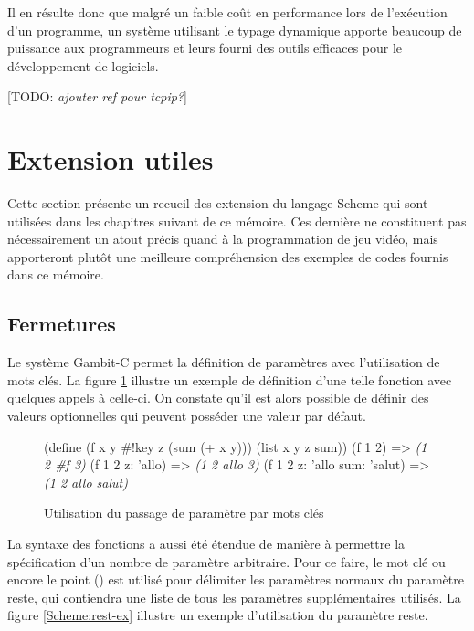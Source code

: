 \documentclass[12pt,oneside,letterpaper,francais]{book}
\newcommand{\todo}[1]{[TODO: {\it #1}]}
\newcommand{\scheme}[1]{\selectlanguage{english}{\tt #1}\selectlanguage{french}}
\newcommand{\schemeresult}[1]{{\it #1}}
\begin{document}
Il en résulte donc que malgré un faible coût en performance lors de
l'exécution d'un programme, un système utilisant le typage dynamique
apporte beaucoup de puissance aux programmeurs et leurs fourni des
outils efficaces pour le développement de logiciels.

\todo{ajouter ref pour tcpip?}



\section{Extension utiles}

Cette section présente un recueil des extension du langage Scheme qui
sont utilisées dans les chapitres suivant de ce mémoire. Ces dernière
ne constituent pas nécessairement un atout précis quand à la
programmation de jeu vidéo, mais apporteront plutôt une meilleure
compréhension des exemples de codes fournis dans ce mémoire.

\subsection{Fermetures}

Le système Gambit-C permet la définition de paramètres avec
l'utilisation de mots clés. La figure \ref{Scheme:fun-key} illustre un
exemple de définition d'une telle fonction avec quelques appels à
celle-ci. On constate qu'il est alors possible de définir des valeurs
optionnelles qui peuvent posséder une valeur par défaut.

\begin{figure}[htb1]
  \begin{schemecode}
(define (f x y \#!key z (sum (+ x y)))
  (list x y z sum))
(f 1 2)                      => \schemeresult{(1 2 \#f 3)}
(f 1 2 z: 'allo)             => \schemeresult{(1 2 allo 3)}
(f 1 2 z: 'allo sum: 'salut) => \schemeresult{(1 2 allo salut)}
  \end{schemecode}
  \caption{Utilisation du passage de paramètre par mots clés}
  \label{Scheme:fun-key}
\end{figure}

La syntaxe des fonctions a aussi été étendue de manière à permettre la
spécification d'un nombre de paramètre arbitraire. Pour ce faire, le
mot clé \scheme{\#!rest} ou encore le point (\scheme{.}) est utilisé
pour délimiter les paramètres normaux du paramètre reste, qui
contiendra une liste de tous les paramètres supplémentaires
utilisés. La figure \ref{Scheme:rest-ex} illustre un exemple
d'utilisation du paramètre reste.
\end{document}
